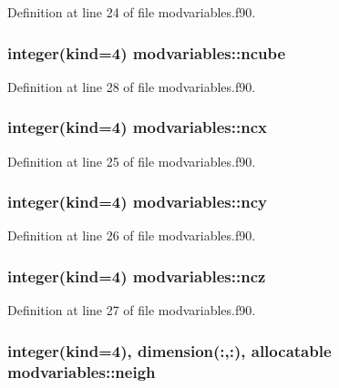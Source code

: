Definition at line 24 of file modvariables.\-f90.

\hypertarget{classmodvariables_ab094334ab9c4ab8644017abf18dcd25f}{
\subsubsection[{ncube}]{\setlength{\rightskip}{0pt plus 5cm}integer(kind=4) modvariables\-::ncube}}\label{classmodvariables_ab094334ab9c4ab8644017abf18dcd25f}


Definition at line 28 of file modvariables.\-f90.

\hypertarget{classmodvariables_ab3c5e83108d2cc8318f235c1f889a162}{
\subsubsection[{ncx}]{\setlength{\rightskip}{0pt plus 5cm}integer(kind=4) modvariables\-::ncx}}\label{classmodvariables_ab3c5e83108d2cc8318f235c1f889a162}


Definition at line 25 of file modvariables.\-f90.

\hypertarget{classmodvariables_a1c1ff1a91ab25fd963a4ce5302249978}{
\subsubsection[{ncy}]{\setlength{\rightskip}{0pt plus 5cm}integer(kind=4) modvariables\-::ncy}}\label{classmodvariables_a1c1ff1a91ab25fd963a4ce5302249978}


Definition at line 26 of file modvariables.\-f90.

\hypertarget{classmodvariables_ab75f9f5dd0ce07892cca908373a51ddc}{
\subsubsection[{ncz}]{\setlength{\rightskip}{0pt plus 5cm}integer(kind=4) modvariables\-::ncz}}\label{classmodvariables_ab75f9f5dd0ce07892cca908373a51ddc}


Definition at line 27 of file modvariables.\-f90.

\hypertarget{classmodvariables_a8602ecbf617fcd3d1c712a4ace68843c}{
\subsubsection[{neigh}]{\setlength{\rightskip}{0pt plus 5cm}integer(kind=4), dimension(\-:,\-:), allocatable modvariables\-::neigh}}\label{classmodvariables_a8602ecbf617fcd3d1c712a4ace68843c}


